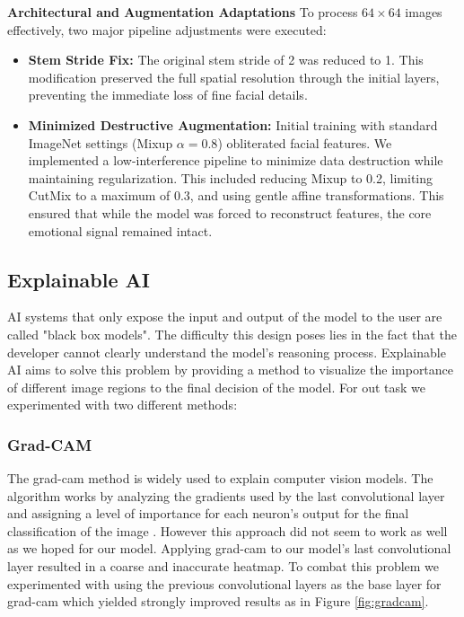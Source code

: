 \textbf{Architectural and Augmentation Adaptations}
To process $64 \times 64$ images effectively, two major pipeline adjustments were executed:
\begin{itemize}
    \item \textbf{Stem Stride Fix:} The original stem stride of 2 was reduced to 1. This modification preserved the full spatial resolution through the initial layers, preventing the immediate loss of fine facial details.
    \item \textbf{Minimized Destructive Augmentation:} Initial training with standard ImageNet settings (Mixup $\alpha=0.8$) obliterated facial features. We implemented a low-interference pipeline to minimize data destruction while maintaining regularization. This included reducing Mixup to 0.2, limiting CutMix to a maximum of 0.3, and using gentle affine transformations. This ensured that while the model was forced to reconstruct features, the core emotional signal remained intact.
\end{itemize}

\subsection{Explainable AI}

AI systems that only expose the input and output of the model to the user are called "black box models". The difficulty this design poses lies in the fact that the developer cannot 
clearly understand the model's reasoning process. Explainable AI aims to solve this problem by providing a method to visualize the importance of different image regions to the final 
decision of the model. For out task we experimented with two different methods:

\subsubsection{Grad-CAM}

The grad-cam method is widely used to explain computer vision models. The algorithm works by analyzing the gradients used by the last convolutional layer and assigning a level of 
importance for each neuron's output for the final classification of the image \cite{DBLP:journals/corr/SelvarajuDVCPB16}. However this approach did not seem to work as well as we hoped 
for our model. Applying grad-cam to our model's last convolutional layer resulted in a coarse and inaccurate heatmap. To combat this problem we experimented with using the previous 
convolutional layers as the base layer for grad-cam which yielded strongly improved results as in Figure \ref{fig:gradcam}.

